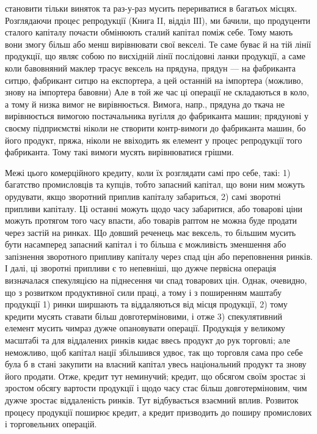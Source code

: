\parcont{}  %
становити тільки виняток та раз-у-раз мусить перериватися в багатьох
місцях. Розглядаючи процес репродукції (Книга II, відділ ІІІ), ми бачили,
що продуценти сталого капіталу почасти обмінюють сталий капітал поміж
себе. Тому мають вони змогу більш або менш вирівнювати свої векселі. Те саме
буває й на тій лінії продукції, що являє собою по висхідній лінії послідовні ланки
продукції, а саме коли бавовняний маклер трасує вексель на прядуна, прядун —
на фабриканта ситцю, фабрикант ситцю на експортера, а цей останній на імпортера
(можливо, знову на імпортера бавовни) Але в той же час ці операції не складаються
в коло, а тому й низка вимог не вирівнюється. Вимога, напр., прядуна
до ткача не вирівнюється вимогою постачальника вугілля до фабриканта машин;
прядунові у своєму підприємстві ніколи не створити контр-вимоги до фабриканта
машин, бо його продукт, пряжа, ніколи не ввіходить як елемент у процес репродукції
того фабриканта. Тому такі вимоги мусять вирівнюватися грішми.

Межі цього комерційного кредиту, коли їх розглядати самі про себе,
такі: 1) багатство промисловців та купців, тобто запасний капітал, що вони ним
можуть орудувати, якщо зворотний приплив капіталу забариться, 2) самі зворотні
припливи капіталу. Ці останні можуть щодо часу забаритися, або товарові ціни
можуть протягом того часу впасти, або товарів раптом не можна буде продати
через застій на ринках. Що довший реченець має вексель, то більшим мусить
бути насамперед запасний капітал і то більша є можливість зменшення або
запізнення зворотного припливу капіталу через спад цін або переповнення ринків.
І далі, ці зворотні припливи є то непевніші, що дужче первісна операція визначалася
спекуляцією на піднесення чи спад товарових цін. Однак, очевидно, що
з розвитком продуктивної сили праці, а тому і з поширенням маштабу продукції
1) ринки ширшають та віддаляються від місця продукції, 2) тому кредити мусять
ставати більш довготерміновими, і отже 3) спекулятивний елемент мусить чимраз
дужче опановувати операції. Продукція у великому масштабі та для віддалених ринків
кидає ввесь продукт до рук торговлі; але неможливо, щоб капітал нації збільшився
удвоє, так що торговля сама про себе була б в стані закупити на власний
капітал увесь національний продукт та знову його продати. Отже, кредит
тут неминучий; кредит, що обсягом своїм зростає зі зростом обсягу вартости
продукції і щодо часу стає більш довготерміновим, чим дужче зростає віддаленість
ринків. Тут відбувається взаємний вплив. Розвиток процесу продукції
поширює кредит, а кредит призводить до поширу промислових і торговельних
операцій.

